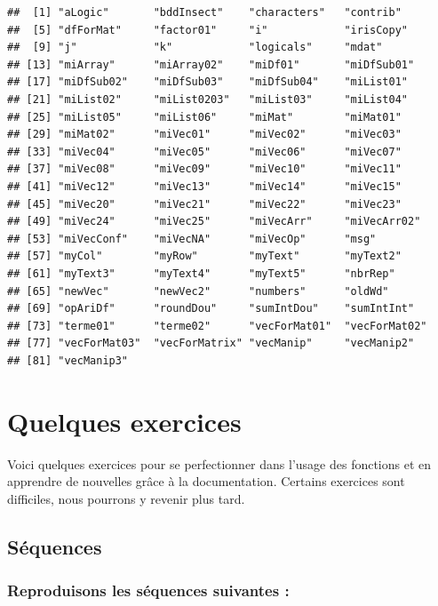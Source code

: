 \documentclass[]{book}
\begin{document}
\begin{verbatim}
##  [1] "aLogic"       "bddInsect"    "characters"   "contrib"     
##  [5] "dfForMat"     "factor01"     "i"            "irisCopy"    
##  [9] "j"            "k"            "logicals"     "mdat"        
## [13] "miArray"      "miArray02"    "miDf01"       "miDfSub01"   
## [17] "miDfSub02"    "miDfSub03"    "miDfSub04"    "miList01"    
## [21] "miList02"     "miList0203"   "miList03"     "miList04"    
## [25] "miList05"     "miList06"     "miMat"        "miMat01"     
## [29] "miMat02"      "miVec01"      "miVec02"      "miVec03"     
## [33] "miVec04"      "miVec05"      "miVec06"      "miVec07"     
## [37] "miVec08"      "miVec09"      "miVec10"      "miVec11"     
## [41] "miVec12"      "miVec13"      "miVec14"      "miVec15"     
## [45] "miVec20"      "miVec21"      "miVec22"      "miVec23"     
## [49] "miVec24"      "miVec25"      "miVecArr"     "miVecArr02"  
## [53] "miVecConf"    "miVecNA"      "miVecOp"      "msg"         
## [57] "myCol"        "myRow"        "myText"       "myText2"     
## [61] "myText3"      "myText4"      "myText5"      "nbrRep"      
## [65] "newVec"       "newVec2"      "numbers"      "oldWd"       
## [69] "opAriDf"      "roundDou"     "sumIntDou"    "sumIntInt"   
## [73] "terme01"      "terme02"      "vecForMat01"  "vecForMat02" 
## [77] "vecForMat03"  "vecForMatrix" "vecManip"     "vecManip2"   
## [81] "vecManip3"
\end{verbatim}

\hypertarget{quelques-exercices}{%
\section{Quelques exercices}\label{quelques-exercices}}

Voici quelques exercices pour se perfectionner dans l'usage des fonctions et en apprendre de nouvelles grâce à la documentation. Certains exercices sont difficiles, nous pourrons y revenir plus tard.

\hypertarget{sequences}{%
\subsection{Séquences}\label{sequences}}

\hypertarget{reproduisons-les-sequences-suivantes}{%
\subsubsection{Reproduisons les séquences suivantes :}\label{reproduisons-les-sequences-suivantes}}
\end{document}
